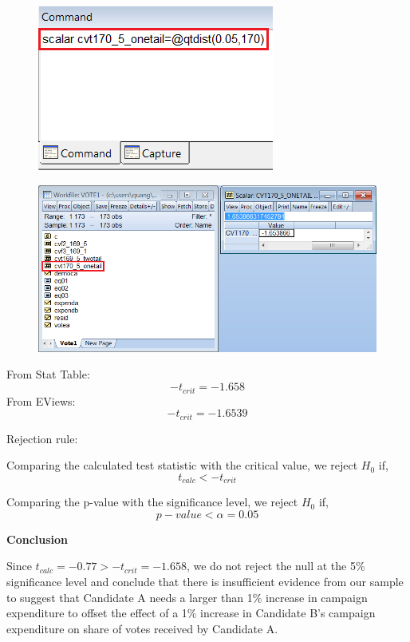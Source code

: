 \documentclass[12pt]{report}
\begin{document}
\begin{figure}[H]
	\centering
	\includegraphics{q1_25}
\end{figure}
\vspace{-\baselineskip}
\begin{figure}[H]
	\centering
	\includegraphics{q1_26}
\end{figure}
\vspace{-\baselineskip}
\noindent From Stat Table:
$$-t_{crit} = -1.658$$
\noindent From EViews:
$$-t_{crit} = -1.6539$$

\noindent Rejection rule: 

\noindent Comparing the calculated test statistic with the critical value, we reject $H_0$ if,
$$t_{calc} < -t_{crit}$$

\noindent Comparing the p-value with the significance level, we reject $H_0$ if,
$$p-value < \alpha = 0.05$$

\newpage
\noindent \textbf{Conclusion}

\noindent Since $t_{calc} =-0.77 > -t_{crit} = -1.658$, we do not reject the null at the 5\% significance level and conclude that there is insufficient evidence from our sample to suggest that Candidate A needs a larger than 1\% increase in campaign expenditure to offset the effect of a 1\% increase in Candidate B’s campaign expenditure on share of votes received by Candidate A.
\end{document}

